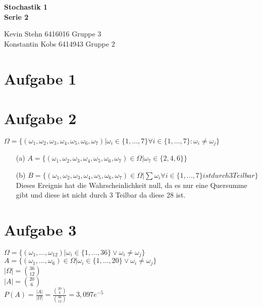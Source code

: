 \documentclass[10pt,a4paper]{article}
\begin{document}
\begin{center}
\textbf{Stochastik 1 \\ Serie 2 \\}
\end{center}

\begin{flushright}
Kevin Stehn 6416016 Gruppe 3 \\
Konstantin Kobs 6414943 Gruppe 2
\end{flushright}

\section*{Aufgabe 1}

\section*{Aufgabe 2}
$\Omega = \{(\omega_{1},\omega_{2},\omega_{3},\omega_{4},\omega_{5},\omega_{6},\omega_{7}) | \omega_{i} \in \{1,...,7\} \forall i \in \{1,...,7\}: \omega_{i} \neq \omega_{j}\}$ \\

\begin{itemize}
\item[(a)] $A = \{(\omega_{1},\omega_{2},\omega_{3},\omega_{4},\omega_{5},\omega_{6},\omega_{7}) \in \Omega | \omega_{7} \in \{2,4,6\}  \}$
\item[(b)] $B = \{(\omega_{1},\omega_{2},\omega_{3},\omega_{4},\omega_{5},\omega_{6},\omega_{7}) \in \Omega |\sum \omega_{i} \forall i \in\{1,...,7\} ist durch 3 Teilbar \}$ Dieses Ereignis hat die Wahrscheinlichkeit null, da es nur eine Quersumme gibt und diese ist nicht durch 3 Teilbar da diese 28 ist.
\end{itemize}

\section*{Aufgabe 3}
$\Omega = \{(\omega_{1},...,\omega_{12}) | \omega_{i} \in \{1,...,36\} \vee \omega_{i} \neq \omega_{j} \}$ \\
$A = \{(\omega_{1},...,\omega_{6}) \in \Omega|\omega_{i} \in \{1,...,20\} \vee \omega_{i} \neq \omega_{j} \}$ \\

$|\Omega| = \binom{36}{12} $ \\
$|A| = \binom{20}{6}$ \\

$P(A) = \frac{|A|}{|\Omega|} = \frac{\binom{20}{6}}{\binom{36}{12}} = 3,097e^{-5}$
\end{document}
